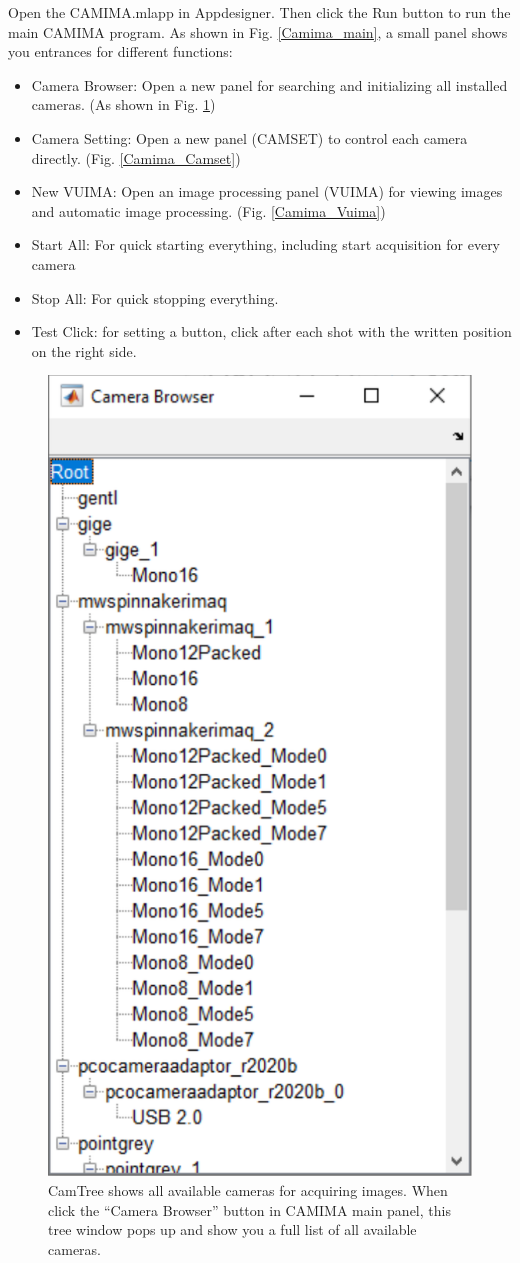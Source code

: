 Open the CAMIMA.mlapp in Appdesigner. Then click the Run button to run the main CAMIMA program. As shown in Fig. \ref{Camima_main}, a small panel shows you entrances for different functions:
\begin{itemize}[noitemsep,topsep=0pt]
    \item Camera Browser: Open a new panel for searching and initializing all installed cameras. (As shown in Fig. \ref{Camima_CamTree})
    \item Camera Setting: Open a new panel (CAMSET) to control each camera directly. (Fig. \ref{Camima_Camset})
    \item New VUIMA: Open an image processing panel (VUIMA) for viewing images and automatic image processing. (Fig. \ref{Camima_Vuima})
    \item Start All: For quick starting everything, including start acquisition for every camera
    \item Stop All: For quick stopping everything.
    \item Test Click: for setting a button, click after each shot with the written position on the right side.
\end{itemize}

\begin{figure}[htb]
\begin{center}
\includegraphics [width = 0.4 \linewidth]{figures/Camima_CamTree.pdf}
\end{center}
\caption[CamTree: show all available cameras for acquiring images]{CamTree shows all available cameras for acquiring images. When click the ``Camera Browser'' button in CAMIMA main panel, this tree window pops up and show you a full list of all available cameras.}
\label{Camima_CamTree}
\end{figure}

